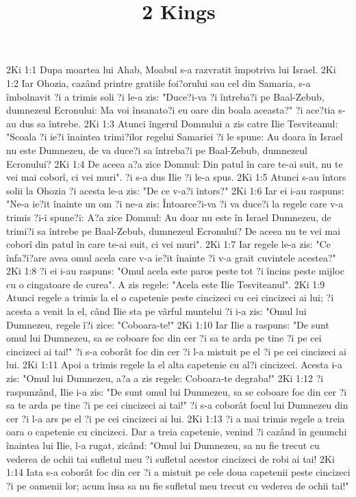 

\title{2 Kings}

2Ki 1:1  Dupa moartea lui Ahab, Moabul s-a razvratit împotriva lui Israel.
2Ki 1:2  Iar Ohozia, cazând printre gratiile foi?orului sau cel din Samaria, s-a îmbolnavit ?i a trimis soli ?i le-a zis: "Duce?i-va ?i întreba?i pe Baal-Zebub, dumnezeul Ecronului: Ma voi însanato?i eu oare din boala aceasta?" ?i ace?tia s-au dus sa întrebe.
2Ki 1:3  Atunci îngerul Domnului a zis catre Ilie Tesviteanul: "Scoala ?i ie?i înaintea trimi?ilor regelui Samariei ?i le spune: Au doara în Israel nu este Dumnezeu, de va duce?i sa întreba?i pe Baal-Zebub, dumnezeul Ecronului?
2Ki 1:4  De aceea a?a zice Domnul: Din patul în care te-ai suit, nu te vei mai coborî, ci vei muri". ?i s-a dus Ilie ?i le-a spus.
2Ki 1:5  Atunci s-au întors solii la Ohozia ?i acesta le-a zis: "De ce v-a?i întors?"
2Ki 1:6  Iar ei i-au raspuns: "Ne-a ie?it înainte un om ?i ne-a zis: Întoarce?i-va ?i va duce?i la regele care v-a trimis ?i-i spune?i: A?a zice Domnul: Au doar nu este în Israel Dumnezeu, de trimi?i sa întrebe pe Baal-Zebub, dumnezeul Ecronului? De aceea nu te vei mai coborî din patul în care te-ai suit, ci vei muri".
2Ki 1:7  Iar regele le-a zis: "Ce înfa?i?are avea omul acela care v-a ie?it înainte ?i v-a grait cuvintele acestea?"
2Ki 1:8  ?i ei i-au raspuns: "Omul acela este paros peste tot ?i încins peste mijloc cu o cingatoare de curea". A zis regele: "Acela este Ilie Tesviteanul".
2Ki 1:9  Atunci regele a trimis la el o capetenie peste cincizeci cu cei cincizeci ai lui; ?i acesta a venit la el, când Ilie sta pe vârful muntelui ?i i-a zis: "Omul lui Dumnezeu, regele î?i zice: "Coboara-te!"
2Ki 1:10  Iar Ilie a raspuns: "De sunt omul lui Dumnezeu, sa se coboare foc din cer ?i sa te arda pe tine ?i pe cei cincizeci ai tai!" ?i s-a coborât foc din cer ?i l-a mistuit pe el ?i pe cei cincizeci ai lui.
2Ki 1:11  Apoi a trimis regele la el alta capetenie cu al?i cincizeci. Acesta i-a zis: "Omul lui Dumnezeu, a?a a zis regele: Coboara-te degraba!"
2Ki 1:12  ?i raspunzând, Ilie i-a zis: "De sunt omul lui Dumnezeu, sa se coboare foc din cer ?i sa te arda pe tine ?i pe cei cincizeci ai tai!" ?i s-a coborât focul lui Dumnezeu din cer ?i l-a ars pe el ?i pe cei cincizeci ai lui.
2Ki 1:13  ?i a mai trimis regele a treia oara o capetenie cu cincizeci. Dar a treia capetenie, venind ?i cazând în genunchi înaintea lui Ilie, l-a rugat, zicând: "Omul lui Dumnezeu, sa nu fie trecut cu vederea de ochii tai sufletul meu ?i sufletul acestor cincizeci de robi ai tai!
2Ki 1:14  Iata s-a coborât foc din cer ?i a mistuit pe cele doua capetenii peste cincizeci ?i pe oamenii lor; acum însa sa nu fie sufletul meu trecut cu vederea de ochii tai!"
